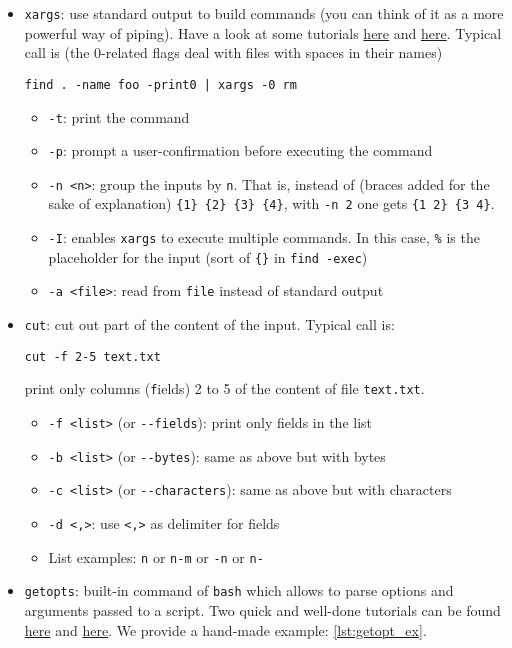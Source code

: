 \documentclass[a4paper,12pt,%
              final%
              ]{article}
\begin{document}
\begin{itemize}
  \item \texttt{xargs}: use standard output to build commands (you can think of it as a more powerful way of piping). Have a look at some tutorials \href{https://shapeshed.com/unix-xargs/}{here} and \href{https://www.thegeekstuff.com/2013/12/xargs-examples/}{here}. Typical call is (the 0-related flags deal with files with spaces in their names)
\begin{verbatim}
find . -name foo -print0 | xargs -0 rm
\end{verbatim}
    \begin{itemize}
      \item \texttt{-t}: print the command
      \item \texttt{-p}: prompt a user-confirmation before executing the command
      \item \texttt{-n <n>}: group the inputs by \texttt{n}. That is, instead of (braces added for the sake of explanation) \verb|{1} {2} {3} {4}|, with \texttt{-n 2} one gets \verb|{1 2} {3 4}|.
      \item \texttt{-I}: enables \texttt{xargs} to execute multiple commands. In this case, \verb|%| is the placeholder for the input (sort of \verb|{}| in \verb|find -exec|)
      \item \texttt{-a <file>}: read from \texttt{file} instead of standard output
    \end{itemize}
  \item \texttt{cut}: cut out part of the content of the input. Typical call is:
\begin{verbatim}
cut -f 2-5 text.txt
\end{verbatim}
    print only columns (\texttt{f}ields) 2 to 5 of the content of file \verb|text.txt|.
    \begin{itemize}
      \item \verb|-f <list>| (or \verb|--fields|): print only fields in the list
      \item \verb|-b <list>| (or \verb|--bytes|): same as above but with bytes
      \item \verb|-c <list>| (or \verb|--characters|): same as above but with characters
      \item \verb|-d <,>|: use \verb|<,>| as delimiter for fields
      \item List examples: \texttt{n} or \texttt{n-m} or \texttt{-n} or \texttt{n-}
    \end{itemize}
  \item \texttt{getopts}: built-in command of \texttt{bash} which allows to parse options and arguments passed to a script. Two quick and well-done tutorials can be found \href{https://www.computerhope.com/unix/bash/getopts.htm}{here} and \href{https://sookocheff.com/post/bash/parsing-bash-script-arguments-with-shopts/}{here}. We provide a hand-made example: \autoref{lst:getopt_ex}.

\end{itemize}
\end{document}
